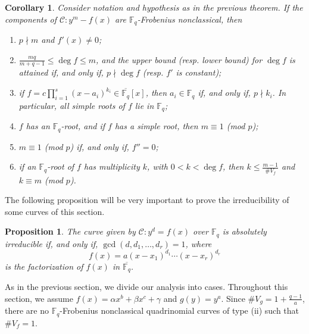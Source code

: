 \documentclass[preprint,12pt]{elsarticle}
\newtheorem{corollary}[theorem]{Corollary}
\newtheorem{proposition}[theorem]{Proposition}
\begin{document}
\begin{corollary}\cite[Corollary 5.4]{borges-separated}\label{borges-corollary}
    Consider notation and hypothesis as in the previous theorem. If the components of $\mathcal{C}: y^m-f(x)$ are $\mathbb{F}_{q}$-Frobenius nonclassical, then
    \begin{enumerate}
        \item[$\mathrm{(i)}$] $p \nmid m$ and $f'(x) \neq 0$;
        \item[$\mathrm{(ii)}$] $\frac{mq}{m + q - 1} \leq \deg f \leq m$, and the upper bound (resp. lower bound) for $\deg f$ is attained if, and only if, $p \nmid \deg f$ (resp. $f'$ is constant);
        \item[$\mathrm{(iii)}$] if $f = c \prod_{i = 1}^s(x - a_i)^{k_i} \in \overline{\mathbb{F}_q}[x]$, then $a_i \in \mathbb{F}_{q}$ if, and only if, $p \nmid k_i$. In particular, all simple roots of $f$ lie in $\mathbb{F}_{q}$;
        \item[$\mathrm{(iv)}$] $f$ has an $\mathbb{F}_{q}$-root, and if $f$ has a simple root, then $m \equiv 1$ (mod $p$);
        \item[$\mathrm{(v)}$] $m \equiv 1$ (mod $p$) if, and only if, $f'' = 0$;
        \item[$\mathrm{(vi)}$] if an $\mathbb{F}_{q}$-root of $f$ has multiplicity $k$, with $0 < k < \deg f$, then $k \leq \frac{m - 1}{\# V_f}$ and $k \equiv m$ (mod $p$).
    \end{enumerate}
\end{corollary}

The following proposition will be very important to prove the irreducibility of some curves of this section.

\begin{proposition}\cite[Lemma I.2C]{schmidt}\label{irreducible}
    The curve given by $\mathcal{C}: y^d = f(x)$ over $\mathbb{F}_q$ is absolutely irreducible if, and only if, $\gcd(d, d_1, \ldots, d_r) = 1$, where 
    $$f(x) = a(x - x_1)^{d_1} \cdots (x-x_r)^{d_r}$$
    is the factorization of $f(x)$ in $\overline{\mathbb{F}_q}$.
\end{proposition}

As in the previous section, we divide our analysis into cases. Throughout this section, we assume $f(x) = \alpha x^b + \beta x^c + \gamma$ and $g(y) = y^a$. Since $\# V_g = 1 + \frac{q - 1}{a}$, there are no $\mathbb{F}_q$-Frobenius nonclassical quadrinomial curves of type (ii) such that $\# V_f = 1$.
\end{document}
